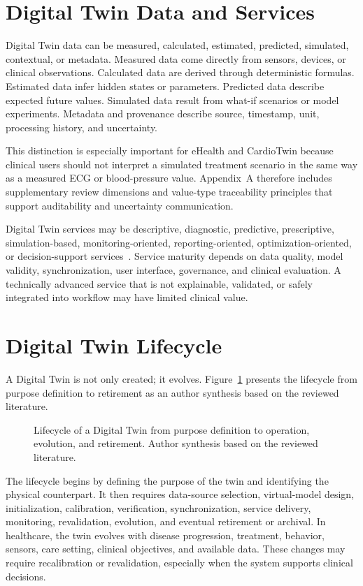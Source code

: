 \section{Digital Twin Data and Services}
Digital Twin data can be measured, calculated, estimated, predicted, simulated, contextual, or metadata. Measured data come directly from sensors, devices, or clinical observations. Calculated data are derived through deterministic formulas. Estimated data infer hidden states or parameters. Predicted data describe expected future values. Simulated data result from what-if scenarios or model experiments. Metadata and provenance describe source, timestamp, unit, processing history, and uncertainty.

This distinction is especially important for eHealth and CardioTwin because clinical users should not interpret a simulated treatment scenario in the same way as a measured ECG or blood-pressure value. Appendix~A therefore includes supplementary review dimensions and value-type traceability principles that support auditability and uncertainty communication.

Digital Twin services may be descriptive, diagnostic, predictive, prescriptive, simulation-based, monitoring-oriented, reporting-oriented, optimization-oriented, or decision-support services~\cite{tao2019digital,fuller2020digital}. Service maturity depends on data quality, model validity, synchronization, user interface, governance, and clinical evaluation. A technically advanced service that is not explainable, validated, or safely integrated into workflow may have limited clinical value.

\section{Digital Twin Lifecycle}
A Digital Twin is not only created; it evolves. Figure~\ref{fig:dt_lifecycle} presents the lifecycle from purpose definition to retirement as an author synthesis based on the reviewed literature.

\begin{figure}[H]
    \centering
    \resizebox{0.95\textwidth}{!}{}
    \caption{Lifecycle of a Digital Twin from purpose definition to operation, evolution, and retirement. Author synthesis based on the reviewed literature.}
    \label{fig:dt_lifecycle}
\end{figure}

The lifecycle begins by defining the purpose of the twin and identifying the physical counterpart. It then requires data-source selection, virtual-model design, initialization, calibration, verification, synchronization, service delivery, monitoring, revalidation, evolution, and eventual retirement or archival. In healthcare, the twin evolves with disease progression, treatment, behavior, sensors, care setting, clinical objectives, and available data. These changes may require recalibration or revalidation, especially when the system supports clinical decisions.

